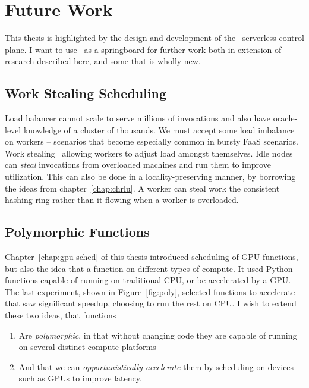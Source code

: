 \section{Future Work}
\label{sec:future}

This thesis is highlighted by the design and development of the \sysname~serverless control plane.
I want to use \sysname~as a springboard for further work both in extension of research described here, and some that is wholly new.

\subsection{Work Stealing Scheduling}
\label{sec:work-steal}

Load balancer cannot scale to serve millions of invocations and also have oracle-level knowledge of a cluster of thousands.
We must accept some load imbalance on workers -- scenarios that become especially common in bursty FaaS scenarios.
Work stealing~\cite{lin2020efficient, guo2010slaw, blumofe1999scheduling} allowing workers to adjust load amongst themselves.
Idle nodes can \emph{steal} invocations from overloaded machines and run them to improve utilization.
This can also be done in a locality-preserving manner, by borrowing the ideas from chapter~\ref{chap:chrlu}.
A worker can steal work  the consistent hashing ring rather than it flowing  when a worker is overloaded.



\subsection{Polymorphic Functions}
\label{chap:new-poly}

Chapter~\ref{chap:gpu-sched} of this thesis introduced scheduling of GPU functions, but also the idea that a function on different types of compute.
It used Python functions capable of running on traditional CPU, or be accelerated by a GPU.
The last experiment, shown in Figure~\ref{fig:poly}, selected functions to accelerate that saw significant speedup, choosing to run the rest on CPU.
I wish to extend these two ideas, that functions
\begin{enumerate}
  \item Are \emph{polymorphic}, in that without changing code they are capable of running on several distinct compute platforms
  \item And that we can \emph{opportunistically accelerate} them by scheduling on devices such as GPUs to improve latency.
\end{enumerate}

